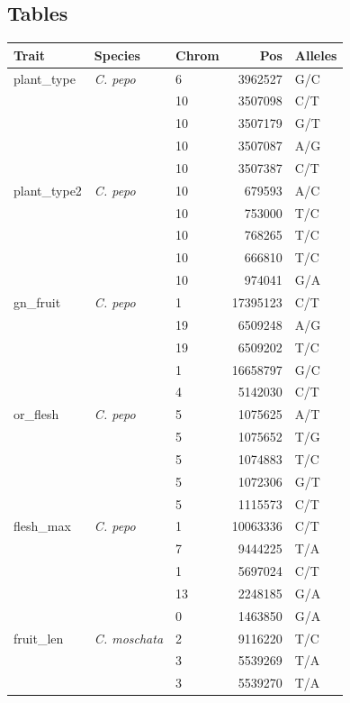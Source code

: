 \documentclass[utf8]{frontiers_suppmat} %
\begin{document}
\subsection{Tables}
\begin{table}[ht]
	\centering
	\begin{tabular}{lllrl}
		\hline
		{\bfseries Trait} & {\bfseries Species} & {\bfseries Chrom} & {\bfseries Pos} & {\bfseries Alleles} \\ 
		\hline
		plant\_type & \textit{C. pepo} & 6 & 3962527 & G/C \\ 
		 &  & 10 & 3507098 & C/T \\ 
	 	&  & 10 & 3507179 & G/T \\ 
		&  & 10 & 3507087 & A/G \\ 
		 &  & 10 & 3507387 & C/T \\ 
		\hline
		plant\_type2 & \textit{C. pepo} & 10 & 679593 & A/C \\ 
		& & 10 & 753000 & T/C \\ 
		 & & 10 & 768265 & T/C \\ 
		 &  & 10 & 666810 & T/C \\ 
		 &  & 10 & 974041 & G/A \\ 
		\hline
		gn\_fruit & \textit{C. pepo} & 1 & 17395123 & C/T \\ 
		 &  & 19 & 6509248 & A/G \\ 
		 &  & 19 & 6509202 & T/C \\ 
		&  & 1 & 16658797 & G/C \\ 
		 &  & 4 & 5142030 & C/T \\ 
		\hline
		or\_flesh & \textit{C. pepo} & 5 & 1075625 & A/T \\ 
		 & & 5 & 1075652 & T/G \\ 
		 &  & 5 & 1074883 & T/C \\ 
		 &  & 5 & 1072306 & G/T \\ 
		 &  & 5 & 1115573 & C/T \\ 
		\hline
		flesh\_max & \textit{C. pepo} & 1 & 10063336 & C/T \\ 
		 &  & 7 & 9444225 & T/A \\ 
		& & 1 & 5697024 & C/T \\ 
		 & & 13 & 2248185 & G/A \\ 
		 &  & 0 & 1463850 & G/A \\ 
		\hline
		fruit\_len & \textit{C. moschata}& 2 & 9116220 & T/C \\ 
		 &  & 3 & 5539269 & T/A \\ 
		 &  & 3 & 5539270 & T/A \\ 

\end{tabular}
\end{table}
\end{document}
